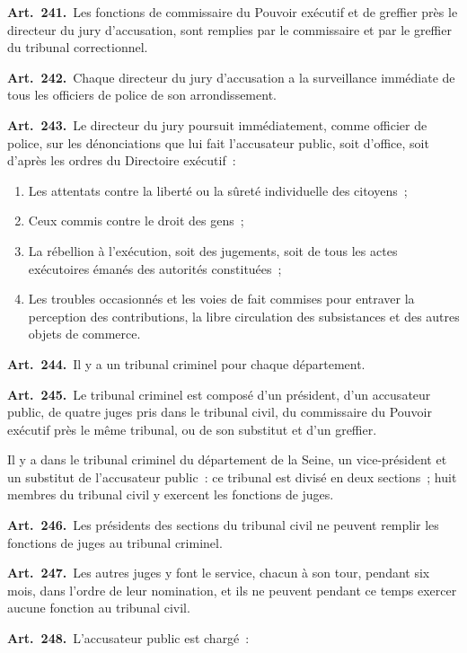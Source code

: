 \documentclass[french,twoside]{book} %
\newcommand{\labelchar}[1]{\textbf{\color{rubric} #1}}
\begin{document}
\labelchar{Art. 241.} Les fonctions de commissaire du Pouvoir exécutif et de greffier près le directeur du jury d’accusation, sont remplies par le commissaire et par le greffier du tribunal correctionnel.\par
\labelchar{Art. 242.} Chaque directeur du jury d’accusation a la surveillance immédiate de tous les officiers de police de son arrondissement.\par
\labelchar{Art. 243.} Le directeur du jury poursuit immédiatement, comme officier de police, sur les dénonciations que lui fait l’accusateur public, soit d’office, soit d’après les ordres du Directoire exécutif :\par

\begin{enumerate}[itemsep=0pt,topsep=0pt,partopsep=0pt,parskip=0pt]
\item Les attentats contre la liberté ou la sûreté individuelle des citoyens ;
\item Ceux commis contre le droit des gens ;
\item La rébellion à l’exécution, soit des jugements, soit de tous les actes exécutoires émanés des autorités constituées ;
\item Les troubles occasionnés et les voies de fait commises pour entraver la perception des contributions, la libre circulation des subsistances et des autres objets de commerce.
\end{enumerate}

\labelchar{Art. 244.} Il y a un tribunal criminel pour chaque département.\par
\labelchar{Art. 245.} Le tribunal criminel est composé d’un président, d’un accusateur public, de quatre juges pris dans le tribunal civil, du commissaire du Pouvoir exécutif près le même tribunal, ou de son substitut et d’un greffier.\par
Il y a dans le tribunal criminel du département de la Seine, un vice-président et un substitut de l’accusateur public : ce tribunal est divisé en deux sections ; huit membres du tribunal civil y exercent les fonctions de juges.\par
\labelchar{Art. 246.} Les présidents des sections du tribunal civil ne peuvent remplir les fonctions de juges au tribunal criminel.\par
\labelchar{Art. 247.} Les autres juges y font le service, chacun à son tour, pendant six mois, dans l’ordre de leur nomination, et ils ne peuvent pendant ce temps exercer aucune fonction au tribunal civil.\par
\labelchar{Art. 248.} L’accusateur public est chargé :\par
\end{document}

